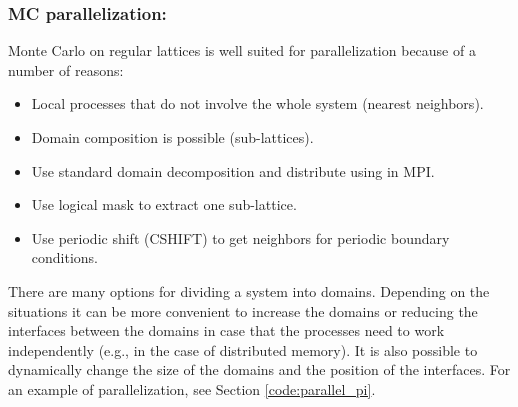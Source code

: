 \vspace{0.3cm}





\subsubsection*{MC parallelization:}

Monte Carlo on regular lattices is well suited for parallelization because of a number of reasons:

\begin{itemize}
\item Local processes that do not involve the whole system (nearest neighbors).
\item Domain composition is possible (sub-lattices).
\item Use standard domain decomposition and distribute using in MPI.
\item Use logical mask to extract one sub-lattice.
\item Use periodic shift (CSHIFT) to get neighbors for periodic boundary conditions.
\end{itemize}

There are many options for dividing a system  into domains. Depending on the situations it can be more convenient to increase the domains or reducing the interfaces between the domains in case that the processes need to work independently (e.g., in the case of distributed memory). It is also possible to dynamically change the size of the domains and the position of the interfaces. For an example of parallelization, see Section \ref{code:parallel_pi}.






